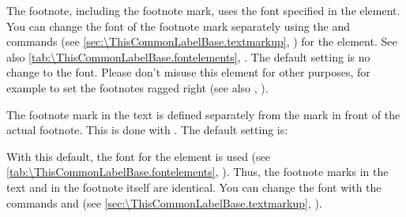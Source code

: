 \BeginIndexGroup
{}%
%
The footnote, including the footnote mark, uses the font specified in the
 element. You can
change the font of the footnote mark separately using the 
 and
 commands (see
\autoref{sec:\ThisCommonLabelBase.textmarkup},
)
for the 
element. See also \autoref{tab:\ThisCommonLabelBase.fontelements},
.
The default setting is no change to the font.%
 Please don't misuse this element for other purposes, for example to set
the footnotes ragged right (see also ,
).

%
%
The footnote mark in the text is defined separately from the mark in
front of the actual footnote. This is done with
. The default setting is:
\begin{lstcode}
\end{lstcode}
With this default, the font for the 
element is used (see \autoref{tab:\ThisCommonLabelBase.fontelements},
). Thus, the footnote marks
in the text and in the footnote itself are identical. You can change the font
with the commands  and
 (see
\autoref{sec:\ThisCommonLabelBase.textmarkup},
).

